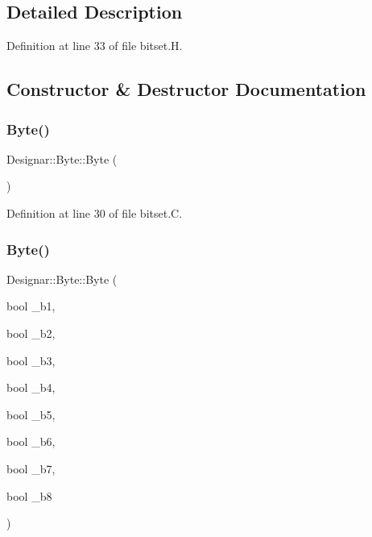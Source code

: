 \subsection{Detailed Description}


Definition at line 33 of file bitset.\+H.



\subsection{Constructor \& Destructor Documentation}
\mbox{\label{class_designar_1_1_byte_a336815c676347de4aa09bc6342169f63}} 
\subsubsection{\texorpdfstring{Byte()}{Byte()}\hspace{0.1cm}{\footnotesize\ttfamily [1/3]}}
{\footnotesize\ttfamily Designar\+::\+Byte\+::\+Byte (\begin{DoxyParamCaption}{ }\end{DoxyParamCaption})}



Definition at line 30 of file bitset.\+C.

\mbox{\label{class_designar_1_1_byte_a21d54a921b6f2e30c189ae2998c40188}} 
\subsubsection{\texorpdfstring{Byte()}{Byte()}\hspace{0.1cm}{\footnotesize\ttfamily [2/3]}}
{\footnotesize\ttfamily Designar\+::\+Byte\+::\+Byte (\begin{DoxyParamCaption}\item[{bool}]{\+\_\+b1,  }\item[{bool}]{\+\_\+b2,  }\item[{bool}]{\+\_\+b3,  }\item[{bool}]{\+\_\+b4,  }\item[{bool}]{\+\_\+b5,  }\item[{bool}]{\+\_\+b6,  }\item[{bool}]{\+\_\+b7,  }\item[{bool}]{\+\_\+b8 }\end{DoxyParamCaption})}



